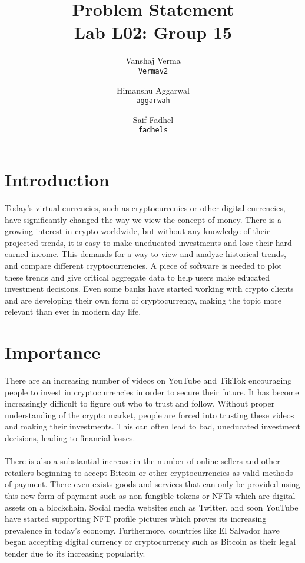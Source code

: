 \documentclass[12pt,fleqn]{article}
\title{\vspace*{150pt}Problem Statement\\\vspace{10pt}Lab L02: Group 15}
\author{
Vanshaj Verma\\
    \texttt{Vermav2}	
	\\
\and 
Himanshu Aggarwal\\
	\texttt{aggarwah}
	\\
\and
Saif Fadhel\\
  	\texttt{fadhels}
  	\\
}
\date{\submissionDate{}}
\begin{document}
\maketitle
\thispagestyle{empty}
\pagebreak

\section{Introduction}
Today's virtual currencies, such as cryptocurrenies or other digital currencies, have significantly changed the way we view the concept of money. There is a growing interest in crypto worldwide, but without any knowledge of their projected trends, it is easy to make uneducated investments and lose their hard earned income. This demands for a way to view and analyze historical trends, and compare different cryptocurrencies. A piece of software is needed to plot these trends and give critical aggregate data to help users make educated investment decisions. Even some banks have started working with crypto clients and are developing their own form of cryptocurrency, making the topic more relevant than ever in modern day life.

\section{Importance}
There are an increasing number of videos on YouTube and TikTok encouraging people to invest in cryptocurrencies in order to secure their future. It has become increasingly difficult to figure out who to trust and follow. Without proper understanding of the crypto market, people are forced into trusting these videos and making their investments. This can often lead to bad, uneducated investment decisions, leading to financial losses.\\\\
There is also a substantial increase in the number of online sellers and other retailers beginning to accept Bitcoin or other cryptocurrencies as valid methods of payment. There even exists goods and services that can only be provided using this new form of payment such as non-fungible tokens or NFTs which are digital assets on a blockchain. Social media websites such as Twitter, and soon YouTube have started supporting NFT profile pictures which proves its increasing prevalence in today's economy. Furthermore, countries like El Salvador have began accepting digital currency or cryptocurrency such as Bitcoin as their legal tender due to its increasing popularity.
\end{document}
